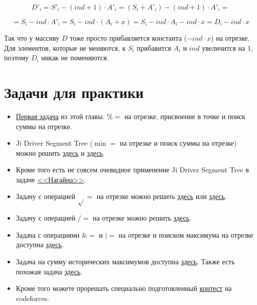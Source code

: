 $$D'_i = S'_i - (ind + 1) \cdot A'_i = (S_i + A'_i) - (ind + 1) \cdot A'_i=$$

$$= S_i - ind \cdot A'_i = S_i - ind \cdot (A_i + x) = S_i - ind \cdot A_i - ind \cdot x = D_i - ind \cdot x$$

Так что у массиву $D$ тоже просто прибавляется константа ($-ind \cdot x$) на отрезке. Для элементов, которые не меняются, к $S_i$ прибавится $A_i$ и $ind$ увеличится на $1$, поэтому $D_i$ никак не поменяются.



\section{Задачи для практики}

\begin{itemize}
 
    \item \href{https://codeforces.com/contest/438/problem/D}{Первая задача} из этой главы. $\%=$ на отрезке, присвоение в точке и поиск суммы на отрезке.

    \item Ji Driver Segment Tree ($\min=$ на отрезке и поиск суммы на отрезке) можно решить \href{https://vjudge.net/problem/HDU-5306}{здесь} и \href{http://acm.hdu.edu.cn/showproblem.php?pid=5306}{здесь}.

    \item Кроме того есть не совсем очевидное применение Ji Driver Segment Tree в задаче \href{https://codeforces.com/problemset/problem/855/F}{<<Нагайна>>}.

    \item Задачу с операцией $\sqrt{}=$ на отрезке можно решить \href{https://vjudge.net/problem/HDU-5828}{здесь} или \href{http://acm.hdu.edu.cn/showproblem.php?pid=5828}{здесь}.

    \item Задачу с операцией $/=$ на отрезке можно решить \href{https://www.hackerrank.com/challenges/box-operations/problem}{здесь}.

    \item Задача с операциями $\&=$ и $|=$ на отрезке и поиском максимума на отрезке доступна \href{https://csacademy.com/contest/round-70/task/and-or-max/}{здесь}.

    \item Задача на сумму исторических максимумов доступна \href{https://uoj.ac/problem/169}{здесь}. Также есть похожая задача \href{https://www.luogu.com.cn/problem/P4314}{здесь}.

    \item Кроме того можете прорешать специально подготовленный \href{https://codeforces.com/group/1rv4rhCsHp/contest/327313}{контест} на codeforces.   
\end{itemize}

